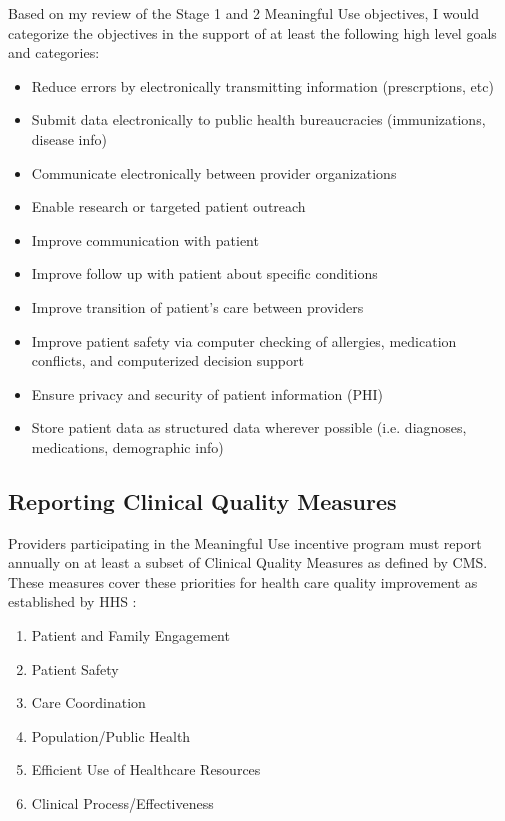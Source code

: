 \documentclass[10pt]{article}
\begin{document}


Based on my review of the Stage 1 and 2 Meaningful Use objectives, I would categorize the objectives in the support of at least the following high level goals and categories:
\begin{itemize}
	\item Reduce errors by electronically transmitting information (prescrptions, etc)
	\item Submit data electronically to public health bureaucracies (immunizations, disease info)
	\item Communicate electronically between provider organizations
	\item Enable research or targeted patient outreach
	\item Improve communication with patient
	\item Improve follow up with patient about specific conditions
	\item Improve transition of patient's care between providers
	\item Improve patient safety via computer checking of allergies, medication conflicts, and computerized decision support
	\item Ensure privacy and security of patient information (PHI)
	\item Store patient data as structured data wherever possible (i.e. diagnoses, medications, demographic info)
\end{itemize}

\subsection{Reporting Clinical Quality Measures}
\label{sec:CQM}



Providers participating in the Meaningful Use incentive program must report annually on at least a subset of Clinical Quality Measures as defined by CMS.
These measures cover these priorities for health care quality improvement as established by HHS \cite{cqm-intro}:
\begin{enumerate}
	\item Patient and Family Engagement
	\item Patient Safety
	\item Care Coordination
	\item Population/Public Health
	\item Efficient Use of Healthcare Resources
	\item Clinical Process/Effectiveness
\end{enumerate}
\end{document}
